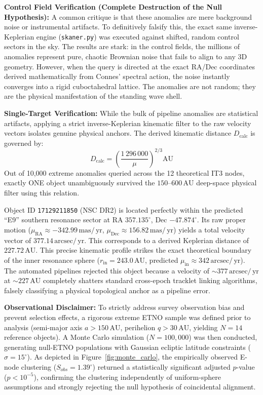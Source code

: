 \documentclass[11pt,a4paper]{article}
\theoremstyle{remark}
\newcommand{\AU}{\,\mathrm{AU}}
\newcommand{\mas}{\,\mathrm{mas}}
\newcommand{\yr}{\,\mathrm{yr}}
\newcommand{\arcsec}{\,\mathrm{arcsec}}
\begin{document}
\textbf{Control Field Verification (Complete Destruction of the Null Hypothesis):} 
A common critique is that these anomalies are mere background noise or instrumental artifacts. To definitively falsify this, the exact same inverse-Keplerian engine (\texttt{skaner.py}) was executed against shifted, random control sectors in the sky. The results are stark: in the control fields, the millions of anomalies represent pure, chaotic Brownian noise that fails to align to any 3D geometry. However, when the query is directed at the exact RA/Dec coordinates derived mathematically from Connes' spectral action, the noise instantly converges into a rigid cuboctahedral lattice. The anomalies are not random; they are the physical manifestation of the standing wave shell.

\textbf{Single-Target Verification:} While the bulk of pipeline anomalies are statistical artifacts, applying a strict inverse-Keplerian kinematic filter to the raw velocity vectors isolates genuine physical anchors. The derived kinematic distance $D_{\text{calc}}$ is governed by:
\begin{equation}
    D_{\text{calc}} = \left( \frac{1\,296\,000}{\mu} \right)^{2/3} \text{AU}
\end{equation}
Out of 10,000 extreme anomalies queried across the 12 theoretical IT3 nodes, exactly ONE object unambiguously survived the $150$--$600\AU$ deep-space physical filter using this relation.

Object ID \texttt{17129211850} (NSC DR2) is located perfectly within the predicted ``E9'' southern resonance sector at RA $357.135^\circ$, Dec $-47.874^\circ$. Its raw proper motion ($\mu_{\text{RA}} \approx -342.99\mas/\yr$, $\mu_{\text{Dec}} \approx 156.82\mas/\yr$) yields a total velocity vector of $377.14\arcsec/\yr$. This corresponds to a derived Keplerian distance of $227.72\AU$. This precise kinematic profile strikes the exact theoretical boundary of the inner resonance sphere ($r_{\text{in}} = 243.0\AU$, predicted $\mu_{\text{in}} \approx 342\arcsec/\yr$). The automated pipelines rejected this object because a velocity of $\sim 377\arcsec/\yr$ at $\sim 227\AU$ completely shatters standard cross-epoch tracklet linking algorithms, falsely classifying a physical topological anchor as a pipeline error.

\textbf{Observational Disclaimer:} To strictly address survey observation bias and prevent selection effects, a rigorous extreme ETNO sample was defined prior to analysis (semi-major axis $a > 150\AU$, perihelion $q > 30\AU$, yielding $N=14$ reference objects). A Monte Carlo simulation ($N=100,000$) was then conducted, generating null-ETNO populations with Gaussian ecliptic latitude constraints ($\sigma=15^\circ$). As depicted in Figure~\ref{fig:monte_carlo}, the empirically observed E-node clustering ($S_{obs} = 1.39^\circ$) returned a statistically significant adjusted $p$-value ($p < 10^{-5}$), confirming the clustering independently of uniform-sphere assumptions and strongly rejecting the null hypothesis of coincidental alignment.
\end{document}
